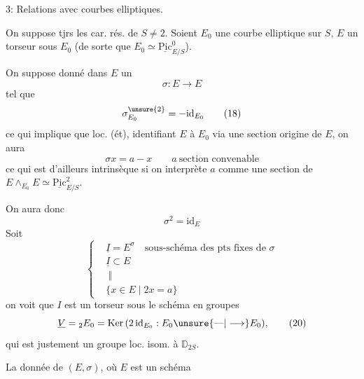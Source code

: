 3: \quad Relations avec courbes elliptiques.

On suppose tjrs les car. rés. de $S\ne 2$. Soient $E_0$ une courbe elliptique sur $S$, $E$ un torseur sous $E_0$ (de sorte que $E_0\simeq\underline{\mathrm{Pic}}^0_{E/S}$).

On suppose donné dans $E$ un 
\[
 \sigma:E\longrightarrow E \tag*{(17)}
\]
tel que
\[
 \sigma_{E_0}^{\unsure{2}}=-\mathrm{id}_{E_0} \tag*{(18)}
\]
ce qui implique que loc. (ét), identifiant $E$ à $E_0$ via une section origine de $E$, on aura
\[
 \sigma x=a-x\qquad a\ \text{section convenable}
\]
ce qui est d'ailleurs intrinsèque si on interprète $a$ comme une section de $E\mathbin{\wedge}_{E_0}E\simeq\underline{\mathrm{Pic}}^2_{E/S}$.

On aura donc
\[
 \sigma^2=\mathrm{id}_E
\]
Soit 
\[
 \left\{\begin{aligned}
 &\underline I=E^\sigma\quad\text{sous-schéma des pts fixes de }\sigma\\
 &\underline I\subset E\\
 &\ \Vert\\[-3pt]
 &\{x\in E\mid 2x=a\}
 \end{aligned}\right. \tag*{(19)}
\]
on voit que $I$ est un torseur sous le schéma en groupes
\[
 \underline V={}_2E_0=\mathrm{Ker}\,(2\,\mathrm{id}_{E_0}:E_0\unsure{\text{—}|\longrightarrow} E_0), \tag*{(20)}
\]
qui est justement un groupe  loc. isom. à $\mathbb D_{2S}$.

La donnée de $(E,\sigma)$, où $E$ est un schéma
